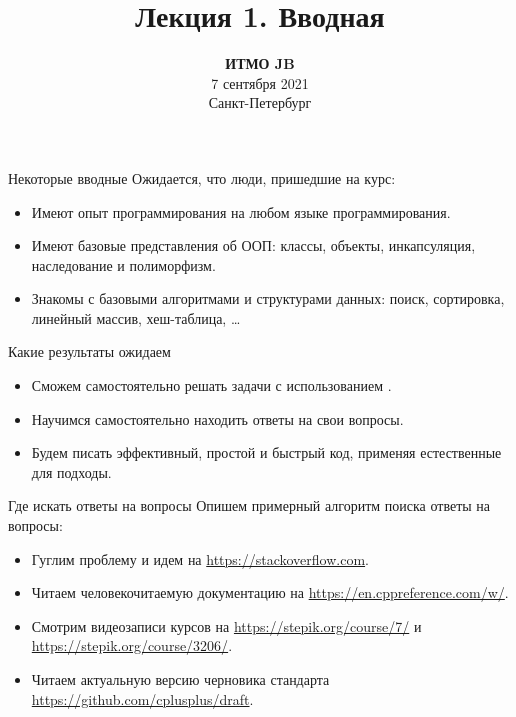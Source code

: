 \documentclass[aspectration=1610,t]{beamer}
\title{Лекция 1. Вводная}
\date{
   \textbf{ИТМО JB}\\
   7 сентября 2021\\
   Санкт-Петербург
}
\begin{document}
\begin{frame}
  \titlepage
\end{frame}


\begin{frame}[fragile]{Некоторые вводные}
    Ожидается, что люди, пришедшие на курс:
    \begin{itemize}
        \item Имеют опыт программирования на любом языке программирования.
        \item Имеют базовые представления об ООП:
            классы, объекты, инкапсуляция, наследование и полиморфизм.
        \item Знакомы с базовыми алгоритмами и структурами данных: 
            поиск, сортировка, линейный массив, хеш-таблица, \dots
    \end{itemize}
\end{frame}

\begin{frame}[fragile]{Какие результаты ожидаем}
    \begin{itemize}
        \item Сможем самостоятельно решать задачи с использованием \langcpp.
        \item Научимся самостоятельно находить ответы на свои вопросы.
        \item Будем писать эффективный, простой и быстрый код,
            применяя естественные для \langcpp подходы.
    \end{itemize}
\end{frame}

\begin{frame}[fragile]{Где искать ответы на вопросы}
    Опишем примерный алгоритм поиска ответы на вопросы:
    \begin{itemize}
        \item Гуглим проблему и идем на \url{https://stackoverflow.com}.
        \item Читаем человекочитаемую документацию на 
            \url{https://en.cppreference.com/w/}.
        \item Смотрим видеозаписи курсов на \url{https://stepik.org/course/7/} и 
            \url{https://stepik.org/course/3206/}.
        \item Читаем актуальную версию черновика стандарта 
            \url{https://github.com/cplusplus/draft}.
    \end{itemize}
\end{frame}
\end{document}
